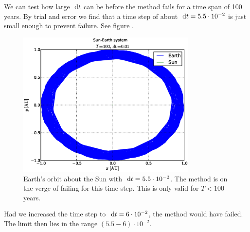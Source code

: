 We can test how large $\ \mathrm{d}t$ can be before the method fails for a time span of 100
years. By trial and error we
find that a time step of about $\ \mathrm{d}t = 5.5 \cdot 10^{-2}$ is just small enough to
prevent failure. See figure .
%
\begin{figure}[htpb]
	\centering
	\includegraphics[width=0.8\textwidth]{figures/sun_earth_T100_dt5-5e-2}
	\caption{Earth's orbit about the Sun with $\ \mathrm{d}t = 5.5 \cdot 10^{-2}$. The
	method is on the verge of failing for this time step. This is only valid for
	$T < 100$ years.}
	\label{fig:sunEarth-dt5.5e-2}
\end{figure}
%
Had we increased the time step to $\ \mathrm{d}t = 6 \cdot 10^{-2}$, the method would have
failed. The limit then lies in the range $(5.5 - 6) \cdot 10^{-2}$.
